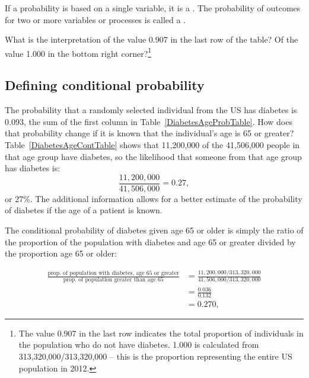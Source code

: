 \begin{termBox}{
If a probability is based on a single variable, it is a \emph{}. The probability of outcomes for two or more variables or processes is called a \emph{}.}
\end{termBox}

\begin{exercise} 
  {What is the interpretation of the value 0.907 in the last row of the table?  Of the value 1.000 in the bottom right corner?\footnote{The value 0.907 in the last row indicates the total proportion of individuals in the population who do not have diabetes. 1.000 is calculated from 313,320,000/313,320,000 -- this is the proportion representing the entire US population in 2012.}}
\label{MarginalJointProbDiabetes}
\end{exercise}


\subsection{Defining conditional probability}


The probability that a randomly selected individual from the US has diabetes is 0.093, the sum of the first column in Table~\ref{DiabetesAgeProbTable}.  How does that probability change if it is known that the individual's age is 65 or greater?  Table~\ref{DiabetesAgeContTable} shows that 11,200,000 of the 41,506,000 people in that age group have diabetes, so the likelihood that someone from that age group has diabetes is:
\[  
     \frac{11,200,000}{41,506,000} = 0.27,
\]
or 27\%.  The additional information allows for a better estimate of the probability of diabetes if the age of a patient is known.

The conditional probability of diabetes given age 65 or older is simply the ratio of the proportion of the population with diabetes and age 65 or greater divided by the proportion age 65 or older:
 
\begin{align*}
    \frac{\text{prop. of population with diabetes, age 65 or greater}}{\text{prop. of population greater than age 65}} &= \frac{11,200,000/313,320,000}{41,506,000/313,320,000}\\
	                               &= \frac{0.036}{0.132} \\
								   &= 0.270,
\end{align*}


